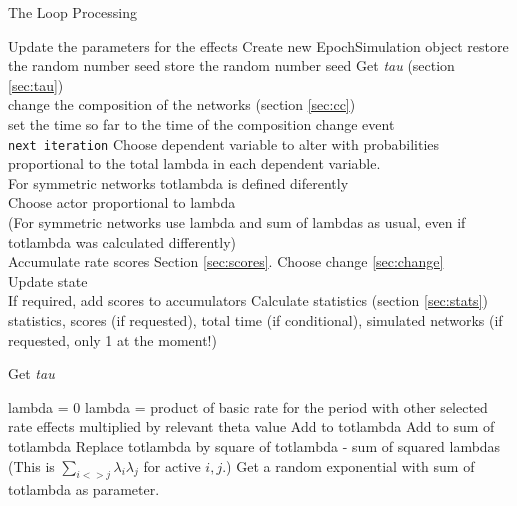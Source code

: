 \documentclass[12pt,a4paper]{article}
\makeatletter
\renewcommand{\=}{\,=\,}
\newcommand{\+}{\,+\,}
\newcommand{\nnm}[1]{\textsf{\small\textit{#1}}}
\renewcommand{\section}{\@startsection{section}{1}
                {0pt}{\baselineskip}{0.5\baselineskip}
                {\centering\sffamily} }
\renewcommand{\subsection}{\@startsection{subsection}{2}
                {0pt}{0.7\baselineskip}{0.3\baselineskip}
                {\sffamily} }
\makeatother
\begin{document}
\section{The Loop Processing}
\begin{algorithmic}
\STATE Update the parameters for the effects
\STATE Create new EpochSimulation object
\STATE restore the random number seed
\ELSE
\STATE store the random number seed
\ENDIF
\REPEAT
\STATE Get \nnm{tau} (section \ref{sec:tau})\\
\STATE change the composition of the networks (section \ref{sec:cc})\\
set the time so far to the time of the composition change event\\
\texttt{next iteration}
\ENDIF
\STATE Choose dependent variable to alter with probabilities
proportional to the total lambda in each dependent variable.\\
\STATE For symmetric networks totlambda is defined diferently\\
\STATE Choose actor proportional to lambda\\
(For symmetric networks use lambda and sum of lambdas as usual, even if
totlambda was calculated differently)\\
\IF{\nnm{deriv}}
\STATE Accumulate rate scores Section \ref{sec:scores}.
\ENDIF
Choose change \ref{sec:change}\\
Update state\\
If required, add scores to accumulators
\STATE Calculate statistics (section \ref{sec:stats})
\ENDFOR
\ENDFOR
\RETURN statistics, scores (if requested), total time (if conditional),
simulated networks (if requested, only 1 at the moment!)
\end{algorithmic}
\subsection{Get \nnm{tau}}
\label{sec:tau}
\begin{algorithmic}
\STATE lambda = 0
\ELSE
\STATE lambda = product of basic rate for the period with other
selected rate effects multiplied by relevant theta value
\ENDIF
\STATE Add to totlambda
\ENDFOR
\STATE Add to sum of totlambda
\STATE Replace totlambda by square of totlambda - sum of squared lambdas\\
\STATE (This is $\sum_{i<>j} \lambda_i \lambda_j$ for active $i, j$.)
\ENDIF
\ENDFOR
\STATE Get a random exponential with sum of totlambda as parameter.\\
\end{algorithmic}
\end{document}
